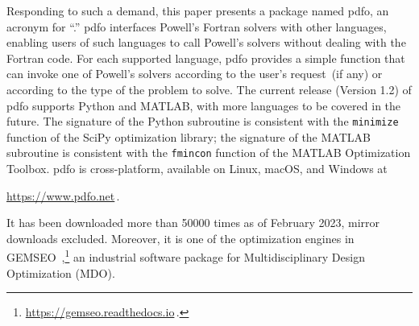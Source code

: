 \documentclass[manuscript,screen,review]{acmart}
\numberwithin{equation}{section}
\begin{document}
Responding to such a demand, this paper presents a package named \gls{pdfo}, an acronym for ``.''
\Gls{pdfo} interfaces Powell's Fortran solvers with other languages, enabling users of such languages to call Powell's solvers without dealing with the Fortran code.
For each supported language, \gls{pdfo} provides a simple function that can invoke one of Powell's solvers according to the user's request~(if any) or according to the type of the problem to solve.
The current release (Version 1.2) of \gls{pdfo} supports Python and MATLAB, with more languages to be covered in the future.
The signature of the Python subroutine is consistent with the \texttt{minimize} function of the SciPy optimization library; the signature of the MATLAB subroutine is consistent with the \texttt{fmincon} function of the MATLAB Optimization Toolbox.
\Gls{pdfo} is cross-platform, available on Linux, macOS, and Windows at
\begin{center}
    \url{https://www.pdfo.net}\,.
\end{center}
It has been downloaded more than \num{50000} times as of February 2023, mirror downloads excluded.
Moreover, it is one of the optimization engines in GEMSEO~\cite{Gallard_Etal_2018},\footnote{\url{https://gemseo.readthedocs.io}\,.} an industrial software package for Multidisciplinary Design Optimization (MDO).
\end{document}
